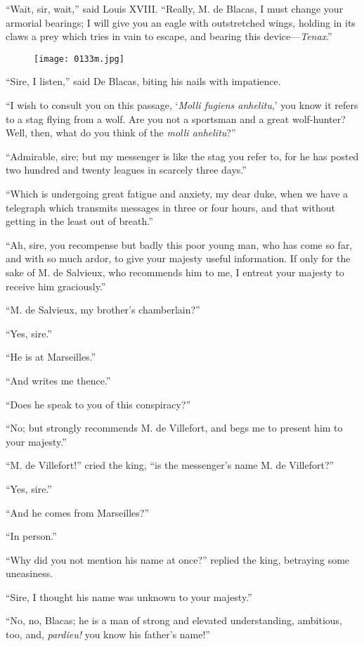 “Wait, sir, wait,” said Louis XVIII. “Really, M. de Blacas, I must
change your armorial bearings; I will give you an eagle with
outstretched wings, holding in its claws a prey which tries in vain to
escape, and bearing this device—\textit{Tenax}.”

\begin{figure}[ht]
\texttt{[image: 0133m.jpg]}
\end{figure}

“Sire, I listen,” said De Blacas, biting his nails with impatience.

“I wish to consult you on this passage, ‘\textit{Molli fugiens anhelitu},’ you
know it refers to a stag flying from a wolf. Are you not a sportsman
and a great wolf-hunter? Well, then, what do you think of the \textit{molli
anhelitu}?”

“Admirable, sire; but my messenger is like the stag you refer to, for
he has posted two hundred and twenty leagues in scarcely three days.”

“Which is undergoing great fatigue and anxiety, my dear duke, when we
have a telegraph which transmits messages in three or four hours, and
that without getting in the least out of breath.”

“Ah, sire, you recompense but badly this poor young man, who has come
so far, and with so much ardor, to give your majesty useful
information. If only for the sake of M. de Salvieux, who recommends him
to me, I entreat your majesty to receive him graciously.”

“M. de Salvieux, my brother’s chamberlain?”

“Yes, sire.”

“He is at Marseilles.”

“And writes me thence.”

“Does he speak to you of this conspiracy?”

“No; but strongly recommends M. de Villefort, and begs me to present
him to your majesty.”

“M. de Villefort!” cried the king, “is the messenger’s name M. de
Villefort?”

“Yes, sire.”

“And he comes from Marseilles?”

“In person.”

“Why did you not mention his name at once?” replied the king, betraying
some uneasiness.

“Sire, I thought his name was unknown to your majesty.”

“No, no, Blacas; he is a man of strong and elevated understanding,
ambitious, too, and, \textit{pardieu!} you know his father’s name!”

